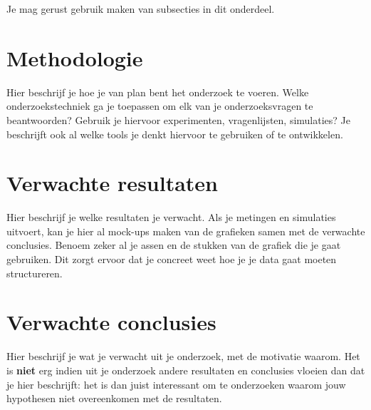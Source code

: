 \documentclass[fleqn,10pt]{voorstel}
\begin{document}

Je mag gerust gebruik maken van subsecties in dit onderdeel.

\section{Methodologie}
\label{sec:methodologie}

Hier beschrijf je hoe je van plan bent het onderzoek te voeren. Welke onderzoekstechniek ga je toepassen om elk van je onderzoeksvragen te beantwoorden? Gebruik je hiervoor experimenten, vragenlijsten, simulaties? Je beschrijft ook al welke tools je denkt hiervoor te gebruiken of te ontwikkelen.

\section{Verwachte resultaten}
\label{sec:verwachte_resultaten}

Hier beschrijf je welke resultaten je verwacht. Als je metingen en simulaties uitvoert, kan je hier al mock-ups maken van de grafieken samen met de verwachte conclusies. Benoem zeker al je assen en de stukken van de grafiek die je gaat gebruiken. Dit zorgt ervoor dat je concreet weet hoe je je data gaat moeten structureren.

\section{Verwachte conclusies}
\label{sec:verwachte_conclusies}

Hier beschrijf je wat je verwacht uit je onderzoek, met de motivatie waarom. Het is \textbf{niet} erg indien uit je onderzoek andere resultaten en conclusies vloeien dan dat je hier beschrijft: het is dan juist interessant om te onderzoeken waarom jouw hypothesen niet overeenkomen met de resultaten.


\printbibliography[heading=bibintoc]
\end{document}
